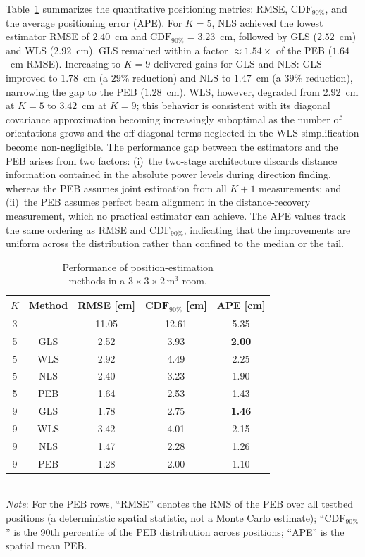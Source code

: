 \documentclass[journal]{IEEEtran}
\newcommand{\added}[1]{{\color{blue}#1}}
\begin{document}
Table~\ref{tab:estimation_performance} summarizes the quantitative positioning metrics: RMSE, $\mathrm{CDF}_{90\%}$, and the average positioning error (APE). \added{For $K=5$, NLS achieved the lowest estimator RMSE of $2.40$~cm and $\mathrm{CDF}_{90\%}=3.23$~cm, followed by GLS ($2.52$~cm) and WLS ($2.92$~cm). GLS remained within a factor $\approx1.54\times$ of the PEB ($1.64$~cm RMSE). Increasing to $K=9$ delivered gains for GLS and NLS: GLS improved to $1.78$~cm (a $29\%$ reduction) and NLS to $1.47$~cm (a $39\%$ reduction), narrowing the gap to the PEB ($1.28$~cm). WLS, however, degraded from $2.92$~cm at $K=5$ to $3.42$~cm at $K=9$; this behavior is consistent with its diagonal covariance approximation becoming increasingly suboptimal as the number of orientations grows and the off-diagonal terms neglected in the WLS simplification become non-negligible.}
\added{The performance gap between the estimators and the PEB arises from two factors: (i)~the two-stage architecture discards distance information contained in the absolute power levels during direction finding, whereas the PEB assumes joint estimation from all $K+1$ measurements; and (ii)~the PEB assumes perfect beam alignment in the distance-recovery measurement, which no practical estimator can achieve.}
The APE values track the same ordering as RMSE and \(\mathrm{CDF}_{90\%}\), indicating that the improvements are uniform across the distribution rather than confined to the median or the tail.

\begin{table}[t]
\centering
\caption{Performance of position-estimation\\ methods in a \(3\times3\times2\,\mathrm{m^3}\) room.}
\label{tab:estimation_performance}
\begin{tabular}{|c| c |c |c| c|}
\hline
\textbf{$K$} & \textbf{Method} & \textbf{RMSE [cm]} & $\textbf{CDF}_{90\%}$ \textbf{[cm]} & \textbf{APE [cm]} \\ \hline
3 & \cite{Chassagne2025} & 11.05 & 12.61 &  5.35 \\ \hline
5 & GLS   &  2.52 &  3.93 &  \textbf{2.00} \\ \hline
5 & WLS   &  2.92 &  4.49 &  2.25 \\ \hline
5 & NLS   &  2.40 &  3.23 &  1.90 \\ \hline
5 & PEB   &  1.64 &  2.53 &  1.43 \\ \hline
9 & GLS   &  1.78 &  2.75 &  \textbf{1.46} \\ \hline
9 & WLS   &  3.42 &  4.01 &  2.15 \\ \hline
9 & NLS   &  1.47 &  2.28 &  1.26 \\ \hline
9 & PEB   &  1.28 &  2.00 &  1.10 \\ \hline
\end{tabular}
\\
\vspace{4pt}
\added{\footnotesize \textit{Note}: For the PEB rows, ``RMSE'' denotes the RMS of the PEB over all testbed positions (a deterministic spatial statistic, not a Monte Carlo estimate); ``CDF$_{90\%}$'' is the 90th percentile of the PEB distribution across positions; ``APE'' is the spatial mean PEB.}
\end{table}
\end{document}
